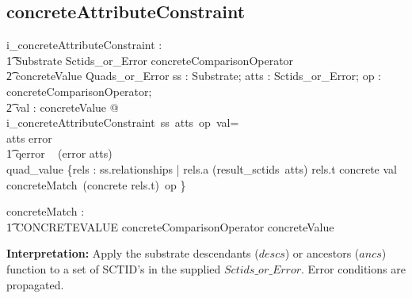 \documentclass{article}
\begin{document}
\subsection{concreteAttributeConstraint}


\begin{gendef}
  i\_concreteAttributeConstraint : \\
\t1 Substrate \fun Sctids\_or\_Error \fun concreteComparisonOperator \fun\\
\t2 concreteValue \fun Quads\_or\_Error
\where
   \forall ss : Substrate; atts : Sctids\_or\_Error; op : concreteComparisonOperator; \\
\t2 val : concreteValue @ \\
i\_concreteAttributeConstraint~ss~atts~op~val= \\
\IF atts \in \ran error \\
\t1 \THEN qerror ~ (error \inv atts) \\
   \ELSE quad\_value \{rels : ss.relationships | rels.a \in (result\_sctids~atts) \land rels.t \in \ran concrete \land val \in concreteMatch~(concrete \inv rels.t)~op \}
\end{gendef}

\begin{gendef}
   concreteMatch : \\
\t1 \power CONCRETEVALUE \fun concreteComparisonOperator \fun \power concreteValue 
\end{gendef}

\noindent
\textbf{Interpretation:}  Apply the substrate descendants ($descs$) or ancestors ($ancs$) function to a set of SCTID's in the supplied
$Sctids\_or\_Error$.  Error conditions are propagated.
\end{document}
